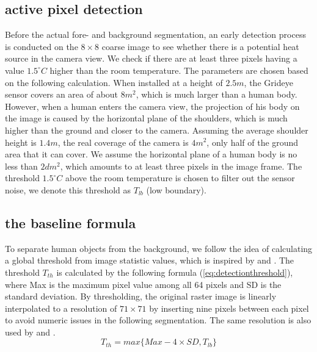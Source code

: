 \subsection{active pixel detection}
Before the actual fore- and background segmentation, an early detection process is conducted on the $8\times8$ coarse image to see whether there is a potential heat source in the camera view. We check if there are at least three pixels having a value $1.5^\circ C$ higher than the room temperature. The parameters are chosen based on the following calculation. When installed at a height of $2.5m$, the Grideye sensor covers an area of about $8m^2$, which is much larger than a human body. However, when a human enters the camera view, the projection of his body on the image is caused by the horizontal plane of the shoulders, which is much higher than the ground and closer to the camera. Assuming the average shoulder height is $1.4m$, the real coverage of the camera is $4m^2$, only half of the ground area that it can cover. We assume the horizontal plane of a human body is no less than $2dm^2$, which amounts to at least three pixels in the image frame. The threshold $1.5^\circ C$ above the room temperature is chosen to filter out the sensor noise, we denote this threshold as $T_{lb}$ (low boundary).
\subsection{the baseline formula}
To separate human objects from the background, we follow the idea of calculating a global threshold from image statistic values, which is inspired by \cite{virtualtrack} and \cite{jeong2014probabilistic}. The threshold $T_{th}$ is calculated by the following formula (\autoref{eq:detectionthreshold}), where Max is the maximum pixel value among all 64 pixels and SD is the standard deviation. By thresholding, the original raster image is linearly interpolated to a resolution of $71\times71$ by inserting nine pixels between each pixel to avoid numeric issues in the following segmentation. The same resolution is also used by \cite{virtualtrack} and \cite{mika}.
\begin{equation}\label{eq:detectionthreshold}
  T_{th} = max\{Max - 4\times SD, T_{lb}\}
\end{equation}

